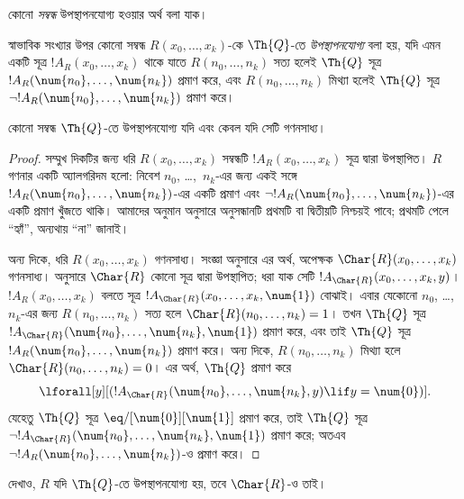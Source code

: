 \documentclass[../../../include/open-logic-section]{subfiles}
\begin{document}


কোনো \emph{সম্বন্ধ} উপস্থাপনযোগ্য হওয়ার অর্থ বলা যাক।

\begin{defn}
 স্বাভাবিক সংখ্যার উপর কোনো সম্বন্ধ
$R(x_0,\dots,x_k)$-কে {$\Th{Q}$-তে \emph{উপস্থাপনযোগ্য}} বলা হয়, যদি এমন
একটি সূত্র $!A_R(x_0,\dots,x_k)$ থাকে যাতে $R(n_0,\dots,n_k)$ সত্য হলেই
$\Th{Q}$ সূত্র $!A_R(\num{n_0},\dots,\num{n_k})$ প্রমাণ করে, এবং
$R(n_0,\dots,n_k)$ মিথ্যা হলেই $\Th{Q}$ সূত্র
$\lnot !A_R(\num{n_0}, \dots, \num{n_k})$ প্রমাণ করে।
\end{defn}

\begin{thm}
 কোনো সম্বন্ধ $\Th{Q}$-তে উপস্থাপনযোগ্য যদি
এবং কেবল যদি সেটি গণনসাধ্য।
\end{thm}

\begin{proof}
সম্মুখ দিকটির জন্য ধরি $R(x_0,\dots,x_k)$ সম্বন্ধটি
$!A_R(x_0,\dots,x_k)$ সূত্র দ্বারা উপস্থাপিত। $R$ গণনার একটি
অ্যালগরিদম হলো: নিবেশ $n_0$, \dots,~$n_k$-এর জন্য একই সঙ্গে
$!A_R(\num{n_0}, \dots, \num{n_k})$-এর একটি প্রমাণ এবং
$\lnot !A_R(\num{n_0}, \dots, \num{n_k})$-এর একটি প্রমাণ খুঁজতে থাকি।
আমাদের অনুমান অনুসারে অনুসন্ধানটি প্রথমটি বা দ্বিতীয়টি নিশ্চয়ই পাবে;
প্রথমটি পেলে ``হ্যাঁ'', অন্যথায় ``না'' জানাই।

অন্য দিকে, ধরি $R(x_0, \dots, x_k)$ গণনসাধ্য। সংজ্ঞা অনুসারে এর অর্থ,
অপেক্ষক $\Char{R}(x_0, \dots, x_k)$ গণনসাধ্য।
 অনুসারে $\Char{R}$ কোনো সূত্র দ্বারা
উপস্থাপিত; ধরা যাক সেটি $!A_{\Char{R}}(x_0, \dots, x_k, y)$।
$!A_R(x_0, \dots, x_k)$ বলতে সূত্র
$!A_{\Char{R}}(x_0, \dots, x_k, \num{1})$ বোঝাই। এবার যেকোনো $n_0$,
\dots,~$n_k$-এর জন্য $R(n_0, \dots, n_k)$ সত্য হলে
$\Char{R}(n_0, \dots, n_k) = 1$। তখন $\Th{Q}$ সূত্র
$!A_{\Char{R}}(\num{n_0}, \dots, \num{n_k}, \num{1})$ প্রমাণ করে, এবং
তাই $\Th{Q}$ সূত্র $!A_R(\num{n_0}, \dots, \num{n_k})$ প্রমাণ করে। অন্য
দিকে, $R(n_0, \dots, n_k)$ মিথ্যা হলে
$\Char{R}(n_0, \dots, n_k) = 0$। এর অর্থ, $\Th{Q}$ প্রমাণ করে
\[
\lforall[y][(!A_{\Char{R}}(\num{n_0}, \dots, \num{n_k}, y) \lif y =
  \num{0})].
\]
যেহেতু $\Th{Q}$ সূত্র $\eq/[\num{0}][\num{1}]$ প্রমাণ করে, তাই $\Th{Q}$
সূত্র $\lnot !A_{\Char{R}}(\num{n_0}, \dots, \num{n_k}, \num{1})$ প্রমাণ
করে; অতএব $\lnot !A_R(\num{n_0}, \dots, \num{n_k})$-ও প্রমাণ করে।
\end{proof}

\begin{prob}
দেখাও, $R$ যদি $\Th{Q}$-তে উপস্থাপনযোগ্য হয়, তবে $\Char{R}$-ও তাই।
\end{prob}
\end{document}
